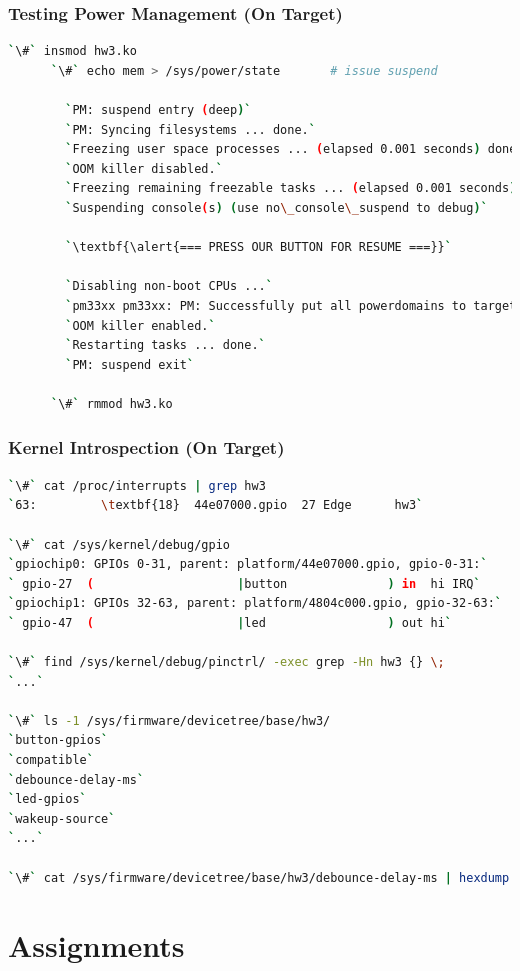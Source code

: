 \documentclass[aspectratio=169,usenames,dvipsnames]{beamer}
\newcounter{cont}
\begin{document}
\begin{frame}[containsverbatim]
  \frametitle{Testing Power Management (On Target)}
  \begin{lstlisting}[language=bash,numbers=none]
      `\#` insmod hw3.ko
      `\#` echo mem > /sys/power/state       # issue suspend

        `PM: suspend entry (deep)`
        `PM: Syncing filesystems ... done.`
        `Freezing user space processes ... (elapsed 0.001 seconds) done.`
        `OOM killer disabled.`
        `Freezing remaining freezable tasks ... (elapsed 0.001 seconds) done.`
        `Suspending console(s) (use no\_console\_suspend to debug)`

        `\textbf{\alert{=== PRESS OUR BUTTON FOR RESUME ===}}`

        `Disabling non-boot CPUs ...`
        `pm33xx pm33xx: PM: Successfully put all powerdomains to target state`
        `OOM killer enabled.`
        `Restarting tasks ... done.`
        `PM: suspend exit`

      `\#` rmmod hw3.ko
  \end{lstlisting}
\end{frame}

\begin{frame}[containsverbatim]
  \frametitle{Kernel Introspection (On Target)}
  \begin{lstlisting}[language=bash,numbers=none]
`\#` cat /proc/interrupts | grep hw3
`63:         \textbf{18}  44e07000.gpio  27 Edge      hw3`

`\#` cat /sys/kernel/debug/gpio
`gpiochip0: GPIOs 0-31, parent: platform/44e07000.gpio, gpio-0-31:`
` gpio-27  (                    |button              ) in  hi IRQ`
`gpiochip1: GPIOs 32-63, parent: platform/4804c000.gpio, gpio-32-63:`
` gpio-47  (                    |led                 ) out hi`

`\#` find /sys/kernel/debug/pinctrl/ -exec grep -Hn hw3 {} \;
`...`

`\#` ls -1 /sys/firmware/devicetree/base/hw3/
`button-gpios`
`compatible`
`debounce-delay-ms`
`led-gpios`
`wakeup-source`
`...`

`\#` cat /sys/firmware/devicetree/base/hw3/debounce-delay-ms | hexdump
  \end{lstlisting}
  \vspace*{-10mm}
\end{frame}

\section{Assignments}
\end{document}

